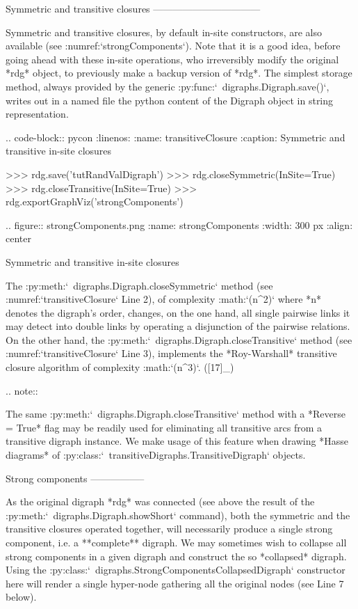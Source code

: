 {Symmetric and transitive closures
---------------------------------

Symmetric and transitive closures, by default in-site constructors, are also available (see :numref:`strongComponents`). Note that it is a good idea, before going ahead with these in-site operations, who irreversibly modify the original *rdg* object, to previously make a backup version of *rdg*. The simplest storage method, always provided by the generic :py:func:`~digraphs.Digraph.save()`, writes out in a named file the python content of the Digraph object in string representation.

.. code-block:: pycon
   :linenos:
   :name: transitiveClosure
   :caption: Symmetric and transitive in-site closures

   >>> rdg.save('tutRandValDigraph')
   >>> rdg.closeSymmetric(InSite=True)
   >>> rdg.closeTransitive(InSite=True)
   >>> rdg.exportGraphViz('strongComponents')

.. figure:: strongComponents.png
   :name: strongComponents	    
   :width: 300 px
   :align: center

   Symmetric and transitive in-site closures

The :py:meth:`~digraphs.Digraph.closeSymmetric` method (see :numref:`transitiveClosure` Line 2), of complexity :math:`(n^2)` where *n* denotes the digraph's order, changes, on the one hand, all single pairwise links it may detect into double links by operating a disjunction of the pairwise relations. On the other hand, the :py:meth:`~digraphs.Digraph.closeTransitive` method (see :numref:`transitiveClosure` Line 3), implements the *Roy-Warshall* transitive closure algorithm of complexity :math:`(n^3)`. ([17]_)

.. note::

   The same :py:meth:`~digraphs.Digraph.closeTransitive` method with a *Reverse = True* flag may be readily used for eliminating all transitive arcs from a transitive digraph instance. We make usage of this feature when drawing *Hasse diagrams* of :py:class:`~transitiveDigraphs.TransitiveDigraph` objects.

Strong components
-----------------

As the original digraph *rdg* was connected (see above the result of the :py:meth:`~digraphs.Digraph.showShort` command), both the symmetric and the transitive closures operated together, will necessarily produce a single strong component, i.e. a **complete** digraph. We may sometimes wish to collapse all strong components in a given digraph and construct the so *collapsed* digraph. Using the :py:class:`~digraphs.StrongComponentsCollapsedDigraph` constructor here will render a single hyper-node gathering all the original nodes (see Line 7 below).

}
